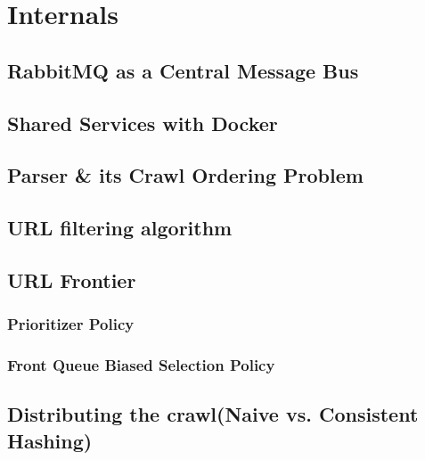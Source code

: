 \section{Internals}
\subsection{RabbitMQ as a Central Message Bus}
\subsection{Shared Services with Docker}
\subsection{Parser \& its Crawl Ordering Problem}
\subsection{URL filtering algorithm}
\subsection{URL Frontier}
\subsubsection{Prioritizer Policy}
\subsubsection{Front Queue Biased Selection Policy}
\subsection{Distributing the crawl(Naive vs. Consistent Hashing)}

\pagebreak